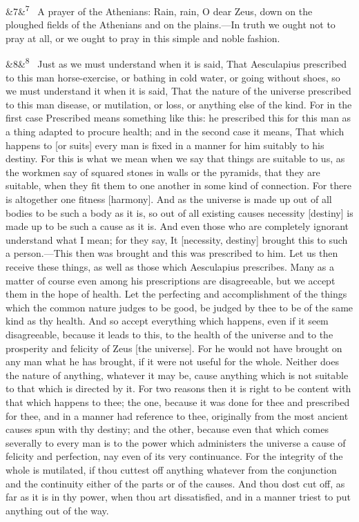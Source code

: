 \documentclass[12pt]{article}
\newcommand{\para}[1][]{\par\noindent\ifx&#1&\else\textsuperscript{\footnotesize #1}~\fi}
\begin{document}
\para[7] A prayer of the Athenians: Rain, rain, O dear Zeus, down on the
ploughed fields of the Athenians and on the plains.---In truth we ought
not to pray at all, or we ought to pray in this simple and noble
fashion.

\para[8] Just as we must understand when it is said, That Aesculapius
prescribed to this man horse-exercise, or bathing in cold water, or
going without shoes, so we must understand it when it is said, That the
nature of the universe prescribed to this man disease, or mutilation, or
loss, or anything else of the kind. For in the first case Prescribed
means something like this: he prescribed this for this man as a thing
adapted to procure health; and in the second case it means, That which
happens to [or suits] every man is fixed in a manner for him suitably
to his destiny. For this is what we mean when we say that things are
suitable to us, as the workmen say of squared stones in walls or the
pyramids, that they are suitable, when they fit them to one another in
some kind of connection. For there is altogether one fitness [harmony].
And as the universe is made up out of all bodies to be such a body as it
is, so out of all existing causes necessity [destiny] is made up to be
such a cause as it is. And even those who are completely ignorant
understand what I mean; for they say, It [necessity, destiny] brought
this to such a person.---This then was brought and this was prescribed to
him. Let us then receive these things, as well as those which
Aesculapius prescribes. Many as a matter of course even among his
prescriptions are disagreeable, but we accept them in the hope of
health. Let the perfecting and accomplishment of the things which the
common nature judges to be good, be judged by thee to be of the same
kind as thy health. And so accept everything which happens, even if it
seem disagreeable, because it leads to this, to the health of the
universe and to the prosperity and felicity of Zeus [the universe]. For
he would not have brought on any man what he has brought, if it were not
useful for the whole. Neither does the nature of anything, whatever it
may be, cause anything which is not suitable to that which is directed
by it. For two reasons then it is right to be content with that which
happens to thee; the one, because it was done for thee and prescribed
for thee, and in a manner had reference to thee, originally from the
most ancient causes spun with thy destiny; and the other, because even
that which comes severally to every man is to the power which
administers the universe a cause of felicity and perfection, nay even of
its very continuance. For the integrity of the whole is mutilated, if
thou cuttest off anything whatever from the conjunction and the
continuity either of the parts or of the causes. And thou dost cut off,
as far as it is in thy power, when thou art dissatisfied, and in a
manner triest to put anything out of the way.
\end{document}
